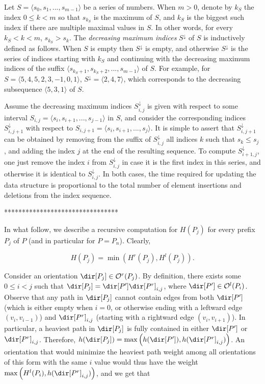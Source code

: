 Let $S = \langle s_0, s_1, ..., s_{m-1}\rangle$ be a series of numbers. When $m > 0$, denote by $k_S$ the index $0 \leq k < m$ so that $s_{k_S}$ is the maximum of $S$, and $k_S$ is the biggest such index if there are multiple maximal values in $S$. In other words, for every $k_S < k < m$, $s_{k_S} > s_k$. The \emph{decreasing maximum indices} $S^{\downarrow}$ of $S$ is inductively defined as follows. When $S$ is empty then $S^{\downarrow}$ is empty, and otherwise $S^{\downarrow}$ is the series of indices starting with $k_S$ and continuing with the decreasing maximum indices of the suffix $\langle s_{k_S+1}, s_{k_S+2}, ..., s_{m-1}\rangle$ of $S$. For example, for $S = \langle 5, 4, 5, 2, 3, -1, 0, 1\rangle$, $S^\downarrow = \langle 2, 4, 7\rangle$, which corresponds to the decreasing subsequence $\langle 5, 3, 1\rangle$ of $S$.

Assume the decreasing maximum indices $S^\downarrow_{i, j}$ is given with respect to some interval $S_{i, j} = \langle s_i, s_{i+1}, ..., s_{j-1}\rangle$ in $S$, and consider the corresponding indices $S^\downarrow_{i, j+1}$ with respect to $S_{i, j+1} = \langle s_i, s_{i+1}, ..., s_{j}\rangle$. It is simple to assert that $S^\downarrow_{i, j+1}$ can be obtained by removing from the suffix of $S^\downarrow_{i, j}$ all indices $k$ such that $s_k \leq s_j$, and adding the index $j$ at the end of the resulting sequence. To compute $S^\downarrow_{i+1, j}$, one just remove the index $i$ from $S^\downarrow_{i, j}$ in case it is the first index in this series, and otherwise it is identical to $S^\downarrow_{i, j}$. In both cases, the time required for updating the data structure is proportional to the total number of element insertions and deletions from the index sequence.




********************************


In what follow, we describe a recursive computation for $H(P_j)$ for every prefix $P_j$ of $P$ (and in particular for $P = P_n$). Clearly,

\begin{equation}\label{eq:H}
H(P_j) = \min\left(H^r(P_j), H^l(P_j)\right).
\end{equation}


Consider an orientation $\dir[P_j] \in \mathcal{O}^r(P_j)$. By definition, there exists some $0 \leq i < j$ such that $\dir[P_j] = \dir[P'] \dir[P^r]_{i, j}$, where $\dir[P'] \in \mathcal{O}^l(P_i)$. Observe that any path in $\dir[P_j]$ cannot contain edges from both $\dir[P']$ (which is either empty when $i=0$, or otherwise ending with a leftward edge $(v_i, v_{i-1})$) and $\dir[P^r]_{i, j}$ (starting with a rightward edge $(v_i, v_{i+1})$). In particular, a heaviest path in $\dir[P_j]$ is fully contained in either $\dir[P']$ or $\dir[P^r]_{i, j}$. Therefore, $h(\dir[P_j]) = \max\left(h(\dir[P']), h(\dir[P^r]_{i, j})\right)$. An orientation that would minimize the heaviest path weight among all orientations of this form with the same $i$ value would thus have the weight $\max\left(H^l(P_i), h(\dir[P^r]_{i, j})\right)$, and we get that 

